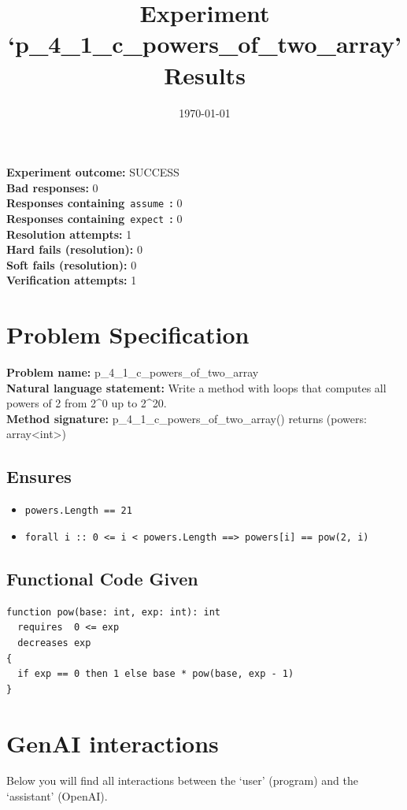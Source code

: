 \documentclass{article}
\begin{document}
\title{Experiment `p\_4\_1\_c\_powers\_of\_two\_array' Results}
\author{\today}
\date{}
\maketitle
\textbf{Experiment outcome: }SUCCESS
\\\textbf{Bad responses: }0
\\\textbf{Responses containing}~\texttt{assume}~\textbf{: }0
\\\textbf{Responses containing}~\texttt{expect}~\textbf{: }0
\\\textbf{Resolution attempts: }1
\\\textbf{Hard fails (resolution): }0
\\\textbf{Soft fails (resolution): }0
\\\textbf{Verification attempts: }1
\section*{Problem Specification}
\textbf{Problem name: }p\_4\_1\_c\_powers\_of\_two\_array
\\\textbf{Natural language statement: }Write a method with loops that computes all powers of 2 from 2\^{}0 up to 2\^{}20.
\\\textbf{Method signature: }p\_4\_1\_c\_powers\_of\_two\_array() returns (powers: array<int>)
\subsection*{Ensures}
\begin{itemize}
\item \texttt{powers.Length == 21}
\item \texttt{forall i :: 0 <= i < powers.Length ==> powers[i] == pow(2, i)}
\end{itemize}
\subsection*{Functional Code Given}
\begin{lstlisting}
function pow(base: int, exp: int): int
  requires  0 <= exp
  decreases exp
{
  if exp == 0 then 1 else base * pow(base, exp - 1)
}
\end{lstlisting}
\clearpage
\section*{GenAI interactions}
Below you will find all interactions between the `user' (program) and the `assistant' (OpenAI).
\end{document}
